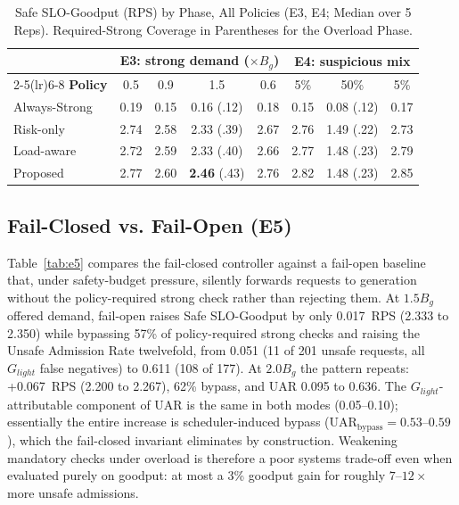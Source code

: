 \documentclass[conference]{IEEEtran}
\newcommand{\Glight}{G_{\mathit{light}}}
\newcommand{\Bg}{B_g}
\begin{document}
\begin{table}[t]
\caption{Safe SLO-Goodput (RPS) by Phase, All Policies (E3, E4; Median over 5 Reps). Required-Strong Coverage in Parentheses for the Overload Phase.}
\label{tab:phases}
\centering
\scriptsize
\setlength{\tabcolsep}{2.5pt}
\begin{tabular}{lccccccc}
\toprule
 & \multicolumn{4}{c}{\textbf{E3: strong demand ($\times\Bg$)}} & \multicolumn{3}{c}{\textbf{E4: suspicious mix}} \\
\cmidrule(lr){2-5}\cmidrule(lr){6-8}
\textbf{Policy} & 0.5 & 0.9 & 1.5 & 0.6 & 5\% & 50\% & 5\% \\
\midrule
Always-Strong & 0.19 & 0.15 & 0.16 (.12) & 0.18 & 0.15 & 0.08 (.12) & 0.17 \\
Risk-only & 2.74 & 2.58 & 2.33 (.39) & 2.67 & 2.76 & 1.49 (.22) & 2.73 \\
Load-aware & 2.72 & 2.59 & 2.33 (.40) & 2.66 & 2.77 & 1.48 (.23) & 2.79 \\
Proposed & 2.77 & 2.60 & \textbf{2.46} (.43) & 2.76 & 2.82 & 1.48 (.23) & 2.85 \\
\bottomrule
\end{tabular}
\end{table}

\subsection{Fail-Closed vs. Fail-Open (E5)}

Table~\ref{tab:e5} compares the fail-closed controller against a fail-open baseline that, under safety-budget pressure, silently forwards requests to generation without the policy-required strong check rather than rejecting them. At $1.5\Bg$ offered demand, fail-open raises Safe SLO-Goodput by only 0.017~RPS (2.333 to 2.350) while bypassing 57\% of policy-required strong checks and raising the Unsafe Admission Rate twelvefold, from 0.051 (11 of 201 unsafe requests, all $\Glight$ false negatives) to 0.611 (108 of 177). At $2.0\Bg$ the pattern repeats: +0.067~RPS (2.200 to 2.267), 62\% bypass, and UAR 0.095 to 0.636. The $\Glight$-attributable component of UAR is the same in both modes (0.05--0.10); essentially the entire increase is scheduler-induced bypass ($\mathrm{UAR}_{\text{bypass}} = 0.53$--$0.59$), which the fail-closed invariant eliminates by construction. Weakening mandatory checks under overload is therefore a poor systems trade-off even when evaluated purely on goodput: at most a 3\% goodput gain for roughly $7$--$12\times$ more unsafe admissions.
\end{document}
